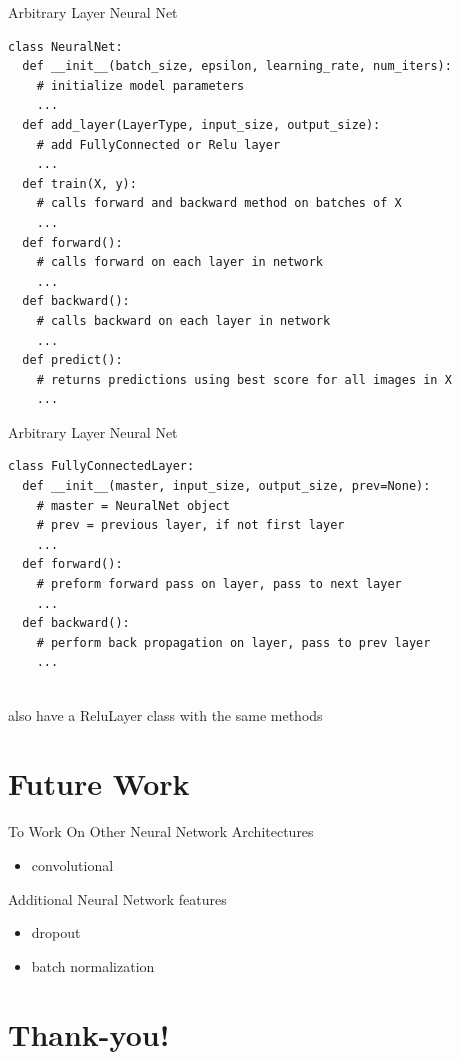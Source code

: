 \documentclass{beamer}
\begin{document}
  \begin{frame}[fragile]{Arbitrary Layer Neural Net}
\begin{verbatim}
class NeuralNet:
  def __init__(batch_size, epsilon, learning_rate, num_iters):
    # initialize model parameters
    ...
  def add_layer(LayerType, input_size, output_size):
    # add FullyConnected or Relu layer
    ...
  def train(X, y):
    # calls forward and backward method on batches of X
    ...
  def forward():
    # calls forward on each layer in network
    ...
  def backward():
    # calls backward on each layer in network
    ...
  def predict():
    # returns predictions using best score for all images in X
    ...
\end{verbatim}
  \end{frame}

  \begin{frame}[fragile]{Arbitrary Layer Neural Net}
\begin{verbatim}
class FullyConnectedLayer:
  def __init__(master, input_size, output_size, prev=None):
    # master = NeuralNet object
    # prev = previous layer, if not first layer
    ...
  def forward():
    # preform forward pass on layer, pass to next layer
    ...
  def backward():
    # perform back propagation on layer, pass to prev layer
    ...
  
\end{verbatim}

also have a {\ttfamily ReluLayer} class with the same methods
  \end{frame}

  \section{Future Work}
  \begin{frame}{To Work On}
    Other Neural Network Architectures
    \begin{itemize}
      \item convolutional
    \end{itemize}
    Additional Neural Network features
    \begin{itemize}
      \item dropout %
      \item batch normalization
    \end{itemize}
  \end{frame}

  \section{Thank-you!}
\end{document}
